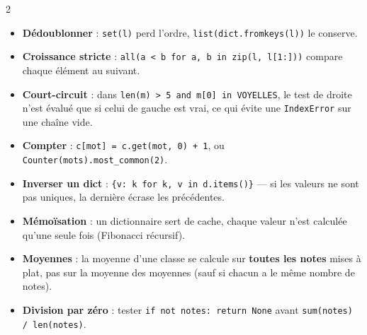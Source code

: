 \documentclass[a4paper,10pt]{article}
\newcommand{\co}[1]{\texttt{\textcolor{codefg}{#1}}}
\begin{document}
\begin{multicols}{2}
\begin{itemize}
  \item \textbf{Dédoublonner} : \co{set(l)} perd l'ordre,
        \co{list(dict.fromkeys(l))} le conserve.
  \item \textbf{Croissance stricte} :
        \co{all(a < b for a, b in zip(l, l[1:]))} compare chaque élément au
        suivant.
  \item \textbf{Court-circuit} : dans \co{len(m) > 5 and m[0] in VOYELLES}, le
        test de droite n'est évalué que si celui de gauche est vrai, ce qui
        évite une \co{IndexError} sur une chaîne vide.
  \item \textbf{Compter} : \co{c[mot] = c.get(mot, 0) + 1}, ou
        \co{Counter(mots).most\_common(2)}.
  \item \textbf{Inverser un dict} : \co{\{v: k for k, v in d.items()\}} --- si
        les valeurs ne sont pas uniques, la dernière écrase les précédentes.
  \item \textbf{Mémoïsation} : un dictionnaire sert de cache, chaque valeur
        n'est calculée qu'une seule fois (Fibonacci récursif).
  \item \textbf{Moyennes} : la moyenne d'une classe se calcule sur
        \textbf{toutes les notes} mises à plat, pas sur la moyenne des
        moyennes (sauf si chacun a le même nombre de notes).
  \item \textbf{Division par zéro} : tester \co{if not notes: return None}
        avant \co{sum(notes) / len(notes)}.
\end{itemize}

\end{multicols}
\end{document}
